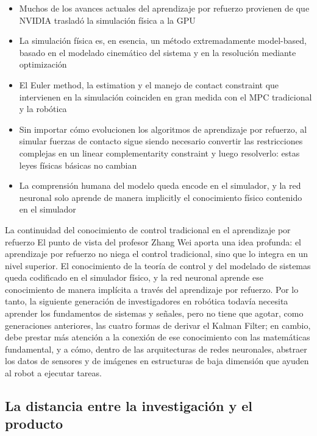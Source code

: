\begin{itemize}
    \item Muchos de los avances actuales del aprendizaje por refuerzo provienen de que NVIDIA trasladó la simulación física a la GPU
    \item La simulación física es, en esencia, un método extremadamente model-based, basado en el modelado cinemático del sistema y en la resolución mediante optimización
    \item El Euler method, la estimation y el manejo de contact constraint que intervienen en la simulación coinciden en gran medida con el MPC tradicional y la robótica
    \item Sin importar cómo evolucionen los algoritmos de aprendizaje por refuerzo, al simular fuerzas de contacto sigue siendo necesario convertir las restricciones complejas en un linear complementarity constraint y luego resolverlo: estas leyes físicas básicas no cambian
    \item La comprensión humana del modelo queda encode en el simulador, y la red neuronal solo aprende de manera implicitly el conocimiento físico contenido en el simulador
\end{itemize}

\begin{importantbox}{La continuidad del conocimiento de control tradicional en el aprendizaje por refuerzo}
El punto de vista del profesor Zhang Wei aporta una idea profunda: el aprendizaje por refuerzo no niega el control tradicional, sino que lo integra en un nivel superior. El conocimiento de la teoría de control y del modelado de sistemas queda codificado en el simulador físico, y la red neuronal aprende ese conocimiento de manera implícita a través del aprendizaje por refuerzo. Por lo tanto, la siguiente generación de investigadores en robótica todavía necesita aprender los fundamentos de sistemas y señales, pero no tiene que agotar, como generaciones anteriores, las cuatro formas de derivar el Kalman Filter; en cambio, debe prestar más atención a la conexión de ese conocimiento con las matemáticas fundamental, y a cómo, dentro de las arquitecturas de redes neuronales, abstraer los datos de sensores y de imágenes en estructuras de baja dimensión que ayuden al robot a ejecutar tareas.
\end{importantbox}

\subsection{La distancia entre la investigación y el producto}

